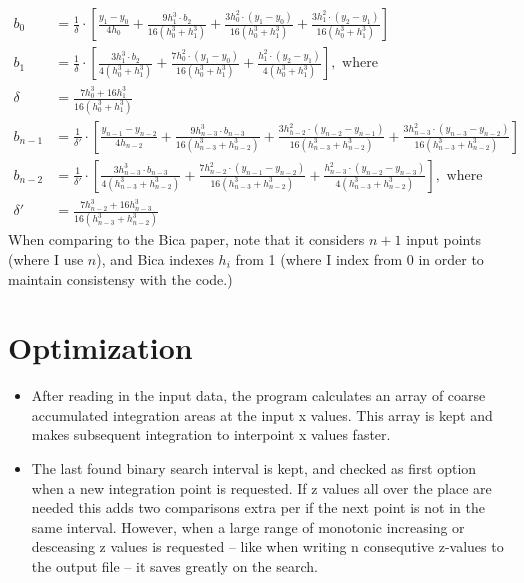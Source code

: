 \documentclass[a4paper]{article}
\begin{document}
\begin{align}
    b_0 &= \frac{1}{\delta} \cdot \left[ \frac{y_1 - y_0}{4h_0} +
    \frac{9h_1^3\cdot b_2}{16(h_0^3+h_1^3)} +
    \frac{3h_0^2\cdot(y_1-y_0)}{16(h_0^3+h_1^3)} +
    \frac{3h_1^2\cdot(y_2-y_1)}{16(h_0^3+h_1^3)} \right ] \\ 
    b_1 &= \frac{1}{\delta} \cdot \left[ \frac{3h_1^3\cdot b_2}{4(h_0^3+h_1^3)} +
    \frac{7h_0^2\cdot(y_1-y_0)}{16(h_0^3+h_1^3)} +
    \frac{h_1^2\cdot(y_2-y_1)}{4(h_0^3+h_1^3)} \right], \text{ where}\\
    \delta &= \frac{7h_0^3+16h_1^3}{16(h_0^3+h_1^3)} \\ 
    b_{n-1} &= \frac{1}{\delta '} \cdot \left[ \frac{y_{n-1} - y_{n-2}}{4h_{n-2}} +
    \frac{9h_{n-3}^3 \cdot b_{n-3}}{16(h_{n-3}^3+h_{n-2}^3)} + 
    \frac{3h_{h-2}^2 \cdot(y_{n-2}-y_{n-1})}{16(h_{n-3}^3+h_{n-2}^3)} +
    \frac{3h_{n-3}^2\cdot(y_{n-3}-y_{n-2})}{16(h_{n-3}^3+h_{n-2}^3)} \right ] \\ 
    b_{n-2} &= \frac{1}{\delta '} \cdot \left[ \frac{3 h_{n-3}^3\cdot b_{n-3}}{4(h_{n-3}^3+h_{n-2}^3)} +
    \frac{7h_{n-2}^2\cdot (y_{n-1}-y_{n-2})}{16(h_{n-3}^3+h_{n-2}^3)} +
    \frac{h_{n-3}^2 \cdot (y_{n-2}-y_{n-3})}{4(h_{n-3}^3+h_{n-2}^3)}  \right], \text{ where} \\ 
    \delta ' &= \frac{7h_{n-2}^3+16h_{n-3}^3}{16(h_{n-3}^3+h_{n-2}^3)}
\end{align}
When comparing to the Bica paper, note that it considers $n+1$ input points (where I use $n$), and Bica indexes $h_i$ from 1 (where I index from 0 in order to maintain consistensy with the code.)

\section{Optimization}
\begin{itemize}
    \item After reading in the input data, the program calculates an array of coarse accumulated integration areas at the input x values. This array is kept and makes subsequent integration to interpoint x values faster.
    
    \item The last found binary search interval is kept, and checked as first option when a new integration point is requested. If z values all over the place are needed this adds two comparisons extra per if the next point is not in the same interval. However, when a large range of monotonic increasing or desceasing z values is requested – like when writing n consequtive z-values to the output file – it saves greatly on the search.
\end{itemize}
\end{document}
